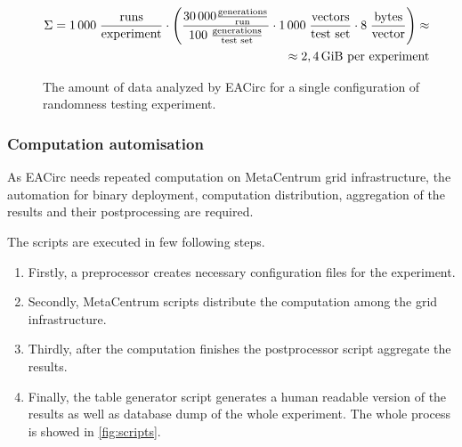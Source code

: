 \documentclass[
  print, %
  Table,   %
  nolof,     %
  nolot,     %
  11pt, %
  oneside  %
]{fithesis3}
\begin{document}
\begin{figure*}[t]
    \begin{equation*}
        \begin{aligned}
    \Sigma = 1\,000 \;
             \frac{\textnormal{runs}}
                  {\textnormal{experiment}}
             \cdot
             \left(
             \frac{30\,000 \frac{\textnormal{generations}}{\textnormal{run}}}
                  {100 \; \frac{\textnormal{generations}}{\textnormal{test set}}}
             \cdot
             1\,000 \;
             \frac{\textnormal{vectors}}
                  {\textnormal{test set}}
             \cdot
             8 \;
             \frac{\textnormal{bytes}}
                  {\textnormal{vector}}
             \right) \approx\\
             \approx 2,4 \textnormal{\,GiB per experiment}
        \end{aligned}
    \end{equation*}
    \caption{The amount of data analyzed by EACirc for a single configuration of randomness testing experiment.}
    \label{fig:dataUsage}
\end{figure*}


\subsubsection{Computation automisation}
\label{subsubsec:method-spec-ss-auto}

As EACirc needs repeated computation on MetaCentrum grid infrastructure, the automation for binary deployment, computation distribution, aggregation of the results and their postprocessing are required.

The scripts are executed in few following steps.

\begin{enumerate}[noitemsep,topsep=3pt,parsep=3pt,partopsep=3pt]
 \item Firstly, a preprocessor creates necessary configuration files for the experiment.
 \item Secondly, MetaCentrum scripts distribute the computation among the grid infrastructure.
 \item Thirdly, after the computation finishes the postprocessor script aggregate the results. 
 \item Finally, the table generator script generates a human readable version of the results as well as database dump of the whole experiment. The whole process is showed in \cref{fig:scripts}.
\end{enumerate}
\end{document}
